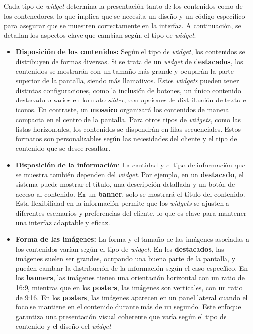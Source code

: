 Cada tipo de \textit{widget} determina la presentación tanto de los contenidos como de los contenedores, lo que implica que se necesita un diseño y 
un código específico para asegurar que se muestren correctamente en la interfaz. A continuación, se detallan los aspectos clave que cambian según 
el tipo de \textit{widget}:

\begin{itemize}
    \item \textbf{Disposición de los contenidos:} Según el tipo de \textit{widget}, los contenidos se distribuyen de formas diversas. Si se trata de 
    un \textit{widget} de \textbf{destacados}, los contenidos se mostrarán con un tamaño más grande y ocuparán la parte superior de la pantalla, 
    siendo más llamativos. Estos \textit{widgets} pueden tener distintas configuraciones, como la inclusión de botones, un único contenido 
    destacado o varios en formato \textit{slider}, con opciones de distribución de texto e iconos. En contraste, un \textbf{mosaico} organizará los 
    contenidos de manera compacta en el centro de la pantalla. Para otros tipos de \textit{widgets}, como las listas horizontales, los contenidos 
    se dispondrán en filas secuenciales. Estos formatos son personalizables según las necesidades del cliente y el tipo de contenido que se desee resaltar.
    
    \item \textbf{Disposición de la información:} La cantidad y el tipo de información que se muestra también dependen del \textit{widget}. Por ejemplo, 
    en un \textbf{destacado}, el sistema puede mostrar el título, una descripción detallada y un botón de acceso al contenido. En un \textbf{banner}, 
    solo se mostrará el título del contenido. Esta flexibilidad en la información permite que los \textit{widgets} se ajusten a diferentes escenarios 
    y preferencias del cliente, lo que es clave para mantener una interfaz adaptable y eficaz.
    
    \item \textbf{Forma de las imágenes:} La forma y el tamaño de las imágenes asociadas a los contenidos varían según el tipo de \textit{widget}. 
    En los \textbf{destacados}, las imágenes suelen ser grandes, ocupando una buena parte de la pantalla, y pueden cambiar la distribución de la 
    información según el caso específico. En los \textbf{banners}, las imágenes tienen una orientación horizontal con un ratio de 16:9, mientras 
    que en los \textbf{posters}, las imágenes son verticales, con un ratio de 9:16. En los \textbf{posters}, las imágenes aparecen en un panel 
    lateral cuando el foco se mantiene en el contenido durante más de un segundo. Este enfoque garantiza una presentación visual coherente que 
    varía según el tipo de contenido y el diseño del \textit{widget}.
    

\end{itemize}

